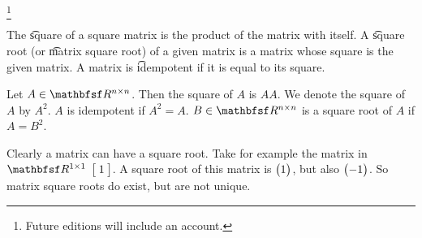 
\footnote{Future editions will include an account.}


The \t{square} of a square matrix is the product of the matrix with itself.
A \t{square root} (or \t{matrix square root}) of a given matrix is a matrix whose square is the given matrix.
A matrix is \t{idempotent} if it is equal to its square.



Let $A \in \R^{n \times n}$.
Then the square of $A$ is $AA$.
We denote the square of $A$ by $A^2$.
$A$ is idempotent if $A^2 = A$.
$B \in \R^{n \times n}$ is a square root of $A$ if $A = B^2$.


Clearly a matrix can have a square root.
Take for example the matrix in $\R^{1 \times 1}$ $\bmat{1}$.
A square root of this matrix is $\begin{pmatrix}1\end{pmatrix}$, but also $\begin{pmatrix}-1\end{pmatrix}$.
So matrix square roots do exist, but are not unique.

\blankpage

